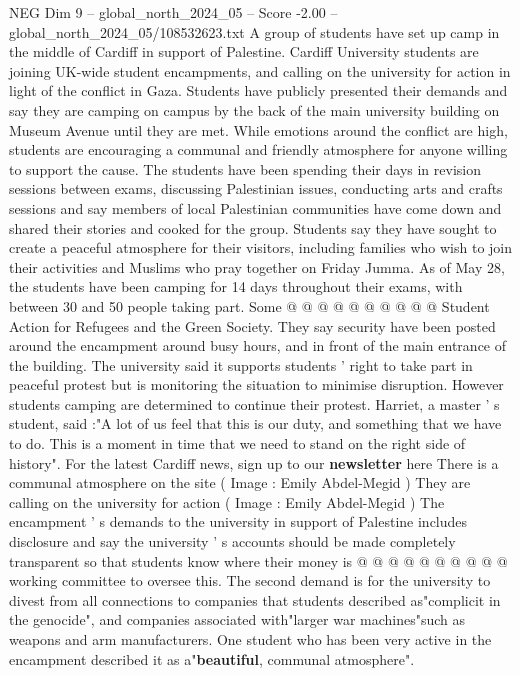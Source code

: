 \begin{textsample}{NEG Dim 9 – global\_north\_2024\_05 – Score -2.00 – global\_north\_2024\_05/108532623.txt}  \label{ex:f9_neg_161}
A group of students have set up camp in the middle of Cardiff in support of Palestine.
Cardiff University students are joining UK-wide student encampments, and calling on the university for action in light of the conflict in Gaza.
Students have publicly presented their demands and say they are camping on campus by the back of the main university building on Museum Avenue until they are met.
While emotions around the conflict are high, students are encouraging a communal and friendly atmosphere for anyone willing to support the cause.
The students have been spending their days in revision sessions between exams, discussing Palestinian issues, conducting arts and crafts sessions and say members of local Palestinian communities have come down and shared their stories and cooked for the group.
Students say they have sought to create a peaceful atmosphere for their visitors, including families who wish to join their activities and Muslims who pray together on Friday Jumma.
As of May 28, the students have been camping for 14 days throughout their exams, with between 30 and 50 people taking part.
Some @ @ @ @ @ @ @ @ @ @ Student Action for Refugees and the Green Society.
They say security have been posted around the encampment around busy hours, and in front of the main entrance of the building.
The university said it supports students ' right to take part in peaceful protest but is monitoring the situation to minimise disruption.
However students camping are determined to continue their protest.
Harriet, a master ' s student, said :"A lot of us feel that this is our duty, and something that we have to do.
This is a moment in time that we need to stand on the right side of history".
For the latest Cardiff news, sign up to our \textbf{newsletter} here There is a communal atmosphere on the site ( Image : Emily Abdel-Megid ) They are calling on the university for action ( Image : Emily Abdel-Megid ) The encampment ' s demands to the university in support of Palestine includes disclosure and say the university ' s accounts should be made completely transparent so that students know where their money is @ @ @ @ @ @ @ @ @ @ working committee to oversee this.
The second demand is for the university to divest from all connections to companies that students described as"complicit in the genocide", and companies associated with"larger war machines"such as weapons and arm manufacturers.
One student who has been very active in the encampment described it as a"\textbf{beautiful}, communal atmosphere".

\end{textsample}
